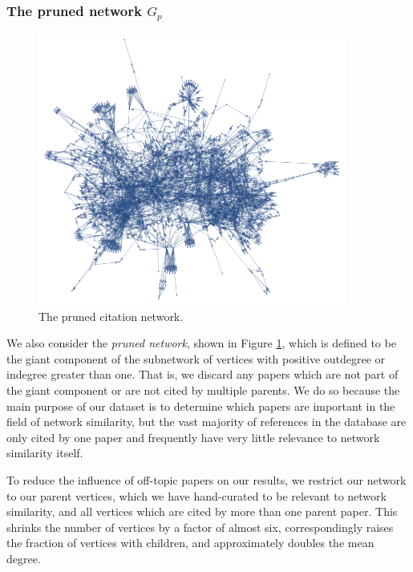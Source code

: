 \documentclass[12pt]{thesis}
\theoremstyle{plain}
\theoremstyle{definition}
\theoremstyle{remark}
\begin{document}
\subsubsection{The pruned network $G_p$}

\begin{figure}[h]
\centering
\includegraphics[width=0.9\textwidth]{subnetwork.png}
\caption{The pruned citation network.}
\label{fig:pruned_network}
\end{figure}

We also consider the \textit{pruned network}, shown in Figure \ref{fig:pruned_network}, which is defined to be the giant component of the subnetwork of vertices with positive outdegree or indegree greater than one. That is, we discard any papers which are not part of the giant component or are not cited by multiple parents. We do so because the main purpose of our dataset is to determine which papers are important in the field of network similarity, but the vast majority of references in the database are only cited by one paper and frequently have very little relevance to network similarity itself. 

To reduce the influence of off-topic papers on our results, we restrict our network to our parent vertices, which we have hand-curated to be relevant to network similarity, and all vertices which are cited by more than one parent paper. This shrinks the number of vertices by a factor of almost six, correspondingly raises the fraction of vertices with children, and approximately doubles the mean degree.
\end{document}
